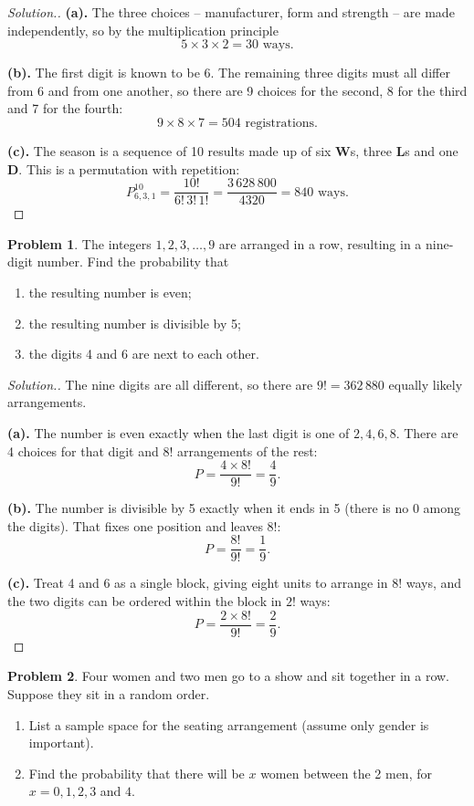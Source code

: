 \documentclass[12pt,a4paper]{report}
\theoremstyle{definition}
\theoremstyle{plain}
\theoremstyle{definition}
\newtheorem{problemx}{Problem}[section]
\newenvironment{problem}{\begin{problemx}}{\end{problemx}}
\newenvironment{solution}
  {\renewcommand{\qedsymbol}{}\begin{proof}[\textit{Solution}.]}
  {\end{proof}}
\begin{document}
\begin{solution}
\textbf{(a).} The three choices -- manufacturer, form and strength -- are made
independently, so by the multiplication principle
\[5 \times 3 \times 2 = 30 \text{ ways}.\]

\textbf{(b).} The first digit is known to be 6. The remaining three digits must
all differ from 6 and from one another, so there are 9 choices for the second,
8 for the third and 7 for the fourth:
\[9 \times 8 \times 7 = 504 \text{ registrations}.\]

\textbf{(c).} The season is a sequence of 10 results made up of six \textbf{W}s,
three \textbf{L}s and one \textbf{D}. This is a permutation with repetition:
\[P^{10}_{6,3,1} = \frac{10!}{6!\,3!\,1!} = \frac{3\,628\,800}{4320} = 840 \text{ ways}.\]
\end{solution}

\begin{problem}
The integers $1, 2, 3, \ldots, 9$ are arranged in a row, resulting in a
nine-digit number. Find the probability that
\begin{enumerate}
\item[(a).] the resulting number is even;
\item[(b).] the resulting number is divisible by 5;
\item[(c).] the digits 4 and 6 are next to each other.
\end{enumerate}
\end{problem}

\begin{solution}
The nine digits are all different, so there are $9! = 362\,880$ equally likely
arrangements.

\textbf{(a).} The number is even exactly when the last digit is one of
$2, 4, 6, 8$. There are 4 choices for that digit and $8!$ arrangements of the
rest:
\[P = \frac{4 \times 8!}{9!} = \frac{4}{9}.\]

\textbf{(b).} The number is divisible by 5 exactly when it ends in 5 (there is
no 0 among the digits). That fixes one position and leaves $8!$:
\[P = \frac{8!}{9!} = \frac{1}{9}.\]

\textbf{(c).} Treat 4 and 6 as a single block, giving eight units to arrange in
$8!$ ways, and the two digits can be ordered within the block in $2!$ ways:
\[P = \frac{2 \times 8!}{9!} = \frac{2}{9}.\]
\end{solution}

\begin{problem}
Four women and two men go to a show and sit together in a row. Suppose they sit in a
random order.
\begin{enumerate}
\item[(a).] List a sample space for the seating arrangement (assume only gender is
important).
\item[(b).] Find the probability that there will be $x$ women between the 2 men, for
$x = 0, 1, 2, 3$ and $4$.
\end{enumerate}
\end{problem}
\end{document}
